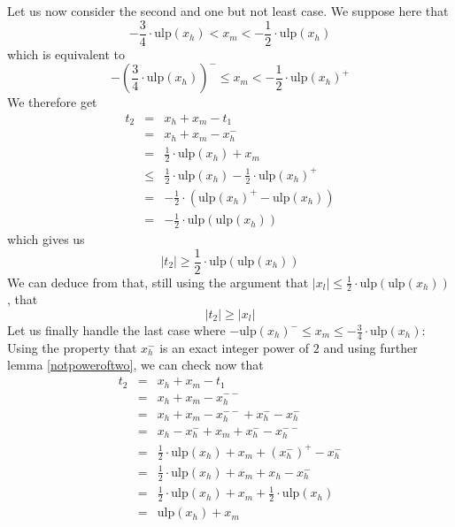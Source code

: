 \documentclass[a4paper,10pt,twoside]{article}
\newenvironment{proof}[1][Proof]{\begin{trivlist}
\item[\hskip \labelsep {\bfseries #1}]}{\end{trivlist}}
\newcommand{\hi}{\ensuremath{\mathit{h}}}
\newcommand{\mi}{\ensuremath{\mathit{m}}}
\newcommand{\lo}{\ensuremath{\mathit{l}}}
\newcommand{\mUlp}{\ensuremath{\mathrm{ulp}}}
\begin{document}
\begin{proof}
Let us now consider the second and one but not least case. We suppose here that
$$-\frac{3}{4} \cdot \mUlp\left( x_\hi \right) < x_\mi < -\frac{1}{2} \cdot \mUlp\left( x_\hi \right)$$
which is equivalent to
$$-\left(\frac{3}{4} \cdot \mUlp\left( x_\hi \right)\right)^- \leq x_\mi < -\frac{1}{2} \cdot \mUlp\left( x_\hi \right)^+$$
We therefore get
\begin{eqnarray*}
t_2 &= & x_\hi + x_\mi - t_1 \\
& = & x_\hi + x_\mi - x_\hi^- \\
& = & \frac{1}{2} \cdot \mUlp\left( x_\hi \right) + x_\mi \\
& \leq & \frac{1}{2} \cdot \mUlp\left( x_\hi \right) - \frac{1}{2} \cdot \mUlp\left( x_\hi \right)^+ \\
& = & -\frac{1}{2} \cdot \left( \mUlp\left( x_\hi \right)^+ - \mUlp\left( x_\hi \right) \right) \\
& = & -\frac{1}{2} \cdot \mUlp\left( \mUlp\left( x_\hi \right) \right)
\end{eqnarray*}
which gives us
$$\left \vert t_2 \right \vert \geq \frac{1}{2} \cdot \mUlp\left( \mUlp\left( x_\hi \right) \right)$$
We can deduce from that, still using the argument that
$\left \vert x_\lo \right \vert \leq \frac{1}{2} \cdot \mUlp\left( \mUlp \left( x_\hi \right) \right)$, that
$$\left \vert t_2 \right \vert \geq \left \vert x_\lo \right \vert $$
Let us finally handle the last case where $-\mUlp\left( x_\hi \right)^- \leq x_\mi \leq - \frac{3}{4} \cdot \mUlp\left( x_\hi \right)$: \\
Using the property that $x_\hi^-$ is an exact integer power of $2$ and using further
lemma \ref{notpoweroftwo}, we can check now that
\begin{eqnarray*}
t_2 & = & x_\hi + x_\mi - t_1 \\
& = & x_\hi + x_\mi - x_\hi^{--} \\
& = & x_\hi + x_\mi - x_\hi^{--} + x_\hi^- - x_\hi^- \\
& = & x_\hi - x_\hi^- + x_\mi + x_\hi^- - x_\hi^{--} \\
& = & \frac{1}{2} \cdot \mUlp\left( x_\hi \right) + x_\mi + \left( x_\hi^- \right)^+ - x_\hi^- \\
& = & \frac{1}{2} \cdot \mUlp\left( x_\hi \right) + x_\mi + x_\hi - x_\hi^- \\
& = & \frac{1}{2} \cdot \mUlp\left( x_\hi \right) + x_\mi + \frac{1}{2} \cdot \mUlp\left( x_\hi \right) \\
& = & \mUlp\left( x_\hi \right) + x_\mi \\

\end{eqnarray*}
\end{proof}
\end{document}
